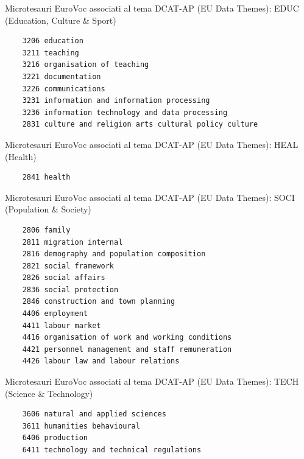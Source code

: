 \documentclass{article}
\theoremstyle{plain}
\theoremstyle{definition}
\begin{document}
Microtesauri EuroVoc associati al tema DCAT-AP (EU Data Themes): EDUC (Education, Culture \& Sport) 
\begin{verbatim}
	3206 education
	3211 teaching 
	3216 organisation of teaching 
	3221 documentation 
	3226 communications
	3231 information and information processing
	3236 information technology and data processing 
	2831 culture and religion arts cultural policy culture
\end{verbatim}
Microtesauri EuroVoc associati al tema DCAT-AP (EU Data Themes): HEAL (Health) 
\begin{verbatim}
	2841 health
\end{verbatim}
Microtesauri EuroVoc associati al tema DCAT-AP (EU Data Themes): SOCI (Population \& Society) 
\begin{verbatim}
	2806 family 
	2811 migration internal 
	2816 demography and population composition 
	2821 social framework
	2826 social affairs
	2836 social protection
	2846 construction and town planning 
	4406 employment
	4411 labour market 
	4416 organisation of work and working conditions 
	4421 personnel management and staff remuneration
	4426 labour law and labour relations
\end{verbatim}
Microtesauri EuroVoc associati al tema DCAT-AP (EU Data Themes): TECH (Science \& Technology)
\begin{verbatim}
	3606 natural and applied sciences 
	3611 humanities behavioural 
	6406 production 
	6411 technology and technical regulations
\end{verbatim}
\end{document}
